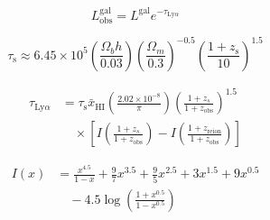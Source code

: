 \begin{equation}
L^{\textrm{gal}}_{\textrm{obs}} = L^{\textrm{gal}} e^{-\tau_{\textrm{Ly}\alpha}}
\end{equation}

\begin{equation}
\tau_{\textrm{s}} \approx  6.45 \times 10^5 \left( \frac{\Omega_b h}{0.03}\right) \left( \frac{\Omega_m}{0.3}\right)^{-0.5} \left(  \frac{1 + z_{\textrm{s}}}{10}\right)^{1.5}
\end{equation}

\begin{align}
\tau_{\textrm{Ly}\alpha} &= \tau_{\textrm{s}} \bar{x}_{\textrm{HI}} \left( \frac{2.02 \times 10^{-8}}{\pi}\right) \left(\frac{1 + z_s}{1 + z_{\textrm{obs}}} \right)^{1.5} \nonumber \\
& \hspace{1em} \times \left[ I\left(\frac{1 + z_s}{1 + z_{\textrm{obs}}} \right) - I\left(\frac{1 + z_{\textrm{reion}}}{1 + z_{\textrm{obs}}}\right) \right]
\end{align}

\begin{align}
I \left(x \right) &= \frac{x^{4.5}}{1 - x} + \frac{9}{7}x^{3.5} + \frac{9}{5}x^{2.5} + 3 x^{1.5} + 9 x^{0.5} \nonumber \\
                & \hspace{1em}- 4.5 \log \left( \frac{1 + x^{0.5}}{1 - x^{0.5}}\right)
\end{align}

